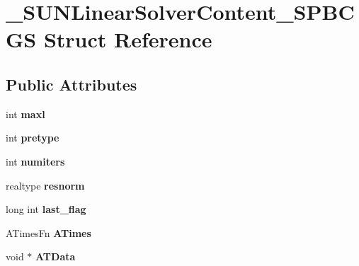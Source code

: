 \hypertarget{struct__SUNLinearSolverContent__SPBCGS}{}\section{\+\_\+\+S\+U\+N\+Linear\+Solver\+Content\+\_\+\+S\+P\+B\+C\+GS Struct Reference}
\label{struct__SUNLinearSolverContent__SPBCGS}
\subsection*{Public Attributes}
\begin{DoxyCompactItemize}
\item 
\mbox{\label{struct__SUNLinearSolverContent__SPBCGS_ae618abe73f086f65f57173e3e34d0644}} 
int {\bfseries maxl}
\item 
\mbox{\label{struct__SUNLinearSolverContent__SPBCGS_a39e679b25a0bf6ce7405533369ede03f}} 
int {\bfseries pretype}
\item 
\mbox{\label{struct__SUNLinearSolverContent__SPBCGS_a239a602cac1fa11d8ced3375085dfbcf}} 
int {\bfseries numiters}
\item 
\mbox{\label{struct__SUNLinearSolverContent__SPBCGS_a2ac26f05357f5d1a04fdbc7dc9cb6ba7}} 
realtype {\bfseries resnorm}
\item 
\mbox{\label{struct__SUNLinearSolverContent__SPBCGS_a3a0e33dd5835cf37f958ec20baf32fc9}} 
long int {\bfseries last\+\_\+flag}
\item 
\mbox{\label{struct__SUNLinearSolverContent__SPBCGS_a9f3ed565f5ce3cd2b3bfcfeb1c2887a6}} 
A\+Times\+Fn {\bfseries A\+Times}
\item 
\mbox{\label{struct__SUNLinearSolverContent__SPBCGS_a6e7ad747f2bd8e6877d41784104bd792}} 
void $\ast$ {\bfseries A\+T\+Data}
\item 
\mbox{\label{struct__SUNLinearSolverContent__SPBCGS_ad769a3aade8aef5639e8498697d84756}} 

\end{DoxyCompactItemize}
